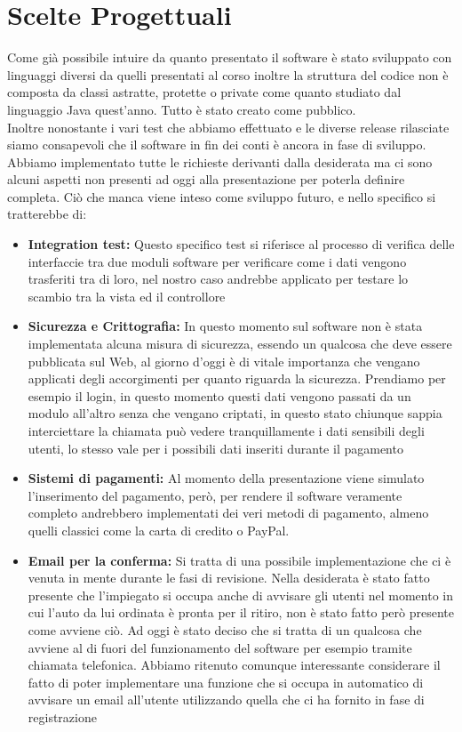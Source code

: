 \documentclass[a4paper, 11pt,oneside]{book}
\begin{document}
    \section{Scelte Progettuali}
        Come già possibile intuire da quanto presentato il software è stato sviluppato con linguaggi diversi da quelli presentati al corso inoltre la struttura del codice non è composta da classi astratte, protette o private come quanto studiato dal linguaggio Java quest'anno. Tutto è stato creato come pubblico.\\
        Inoltre nonostante i vari test che abbiamo effettuato e le diverse release rilasciate siamo consapevoli che il software in fin dei conti è ancora in fase di sviluppo. Abbiamo implementato tutte le richieste derivanti dalla desiderata ma ci sono alcuni aspetti non presenti ad oggi alla presentazione per poterla definire completa. Ciò che manca viene inteso 
        come sviluppo futuro, e nello specifico si tratterebbe di:
        \begin{itemize}
            \item \textbf{Integration test:} Questo specifico test si riferisce al processo di verifica delle interfaccie tra due moduli software per verificare come i dati vengono trasferiti tra di loro, nel nostro caso andrebbe applicato per testare lo scambio tra la vista ed il controllore
            \item \textbf{Sicurezza e Crittografia:} In questo momento sul software non è stata implementata alcuna misura di sicurezza, essendo un qualcosa che deve essere pubblicata sul Web, al giorno d'oggi è di vitale importanza che vengano applicati degli accorgimenti per quanto riguarda la sicurezza. Prendiamo per esempio il login, in questo momento questi dati vengono
            passati da un modulo all'altro senza che vengano criptati, in questo stato chiunque sappia interciettare la chiamata può vedere tranquillamente i dati sensibili degli utenti, lo stesso vale per i possibili dati inseriti durante il pagamento
            \item \textbf{Sistemi di pagamenti:} Al momento della presentazione viene simulato l'inserimento del pagamento, però, per rendere il software veramente completo andrebbero implementati dei veri metodi di pagamento, almeno quelli classici come la carta di credito o PayPal.
            \item \textbf{Email per la conferma:} Si tratta di una possibile implementazione che ci è venuta in mente durante le fasi di revisione. Nella desiderata è stato fatto presente che l'impiegato si occupa anche di avvisare gli utenti nel momento in cui l'auto da lui ordinata è pronta per il ritiro, non è stato fatto però presente come avviene ciò. Ad oggi è stato deciso
            che si tratta di un qualcosa che avviene al di fuori del funzionamento del software per esempio tramite chiamata telefonica. Abbiamo ritenuto comunque interessante considerare il fatto di poter implementare una funzione che si occupa in automatico di avvisare un email all'utente utilizzando quella che ci ha fornito in fase di registrazione
        \end{itemize}
\end{document}
